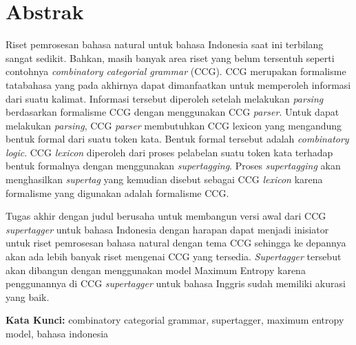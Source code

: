 \chapter*{Abstrak}

Riset pemrosesan bahasa natural untuk bahasa Indonesia saat ini terbilang sangat sedikit.
Bahkan, masih banyak area riset yang belum tersentuh seperti contohnya
\textit{combinatory categorial grammar} (CCG).
CCG merupakan formalisme tatabahasa yang pada akhirnya dapat dimanfaatkan untuk memperoleh informasi
dari suatu kalimat.
Informasi tersebut diperoleh setelah melakukan \textit{parsing} berdasarkan formalisme CCG dengan
menggunakan CCG \textit{parser}.
Untuk dapat melakukan \textit{parsing}, CCG \textit{parser} membutuhkan CCG lexicon yang mengandung
bentuk formal dari suatu token kata.
Bentuk formal tersebut adalah \textit{combinatory logic}.
CCG \textit{lexicon} diperoleh dari proses pelabelan suatu token kata terhadap bentuk formalnya dengan
menggunakan \textit{supertagging}.
Proses \textit{supertagging} akan menghasilkan \textit{supertag} yang kemudian disebut sebagai CCG
\textit{lexicon} karena formalisme yang digunakan adalah formalisme CCG.

Tugas akhir dengan judul \textbf{\Title} berusaha untuk membangun versi awal dari CCG
\textit{supertagger} untuk bahasa Indonesia dengan harapan dapat menjadi inisiator untuk riset
pemrosesan bahasa natural dengan tema CCG sehingga ke depannya akan ada lebih banyak riset
mengenai CCG yang tersedia.
\textit{Supertagger} tersebut akan dibangun dengan menggunakan model Maximum Entropy karena
penggunannya di CCG \textit{supertagger} untuk bahasa Inggris sudah memiliki akurasi yang baik.


\vspace{0.5 cm}
\begin{flushleft}
{\textbf{Kata Kunci:}
  combinatory categorial grammar, supertagger, maximum entropy model, bahasa indonesia
}
\end{flushleft}
